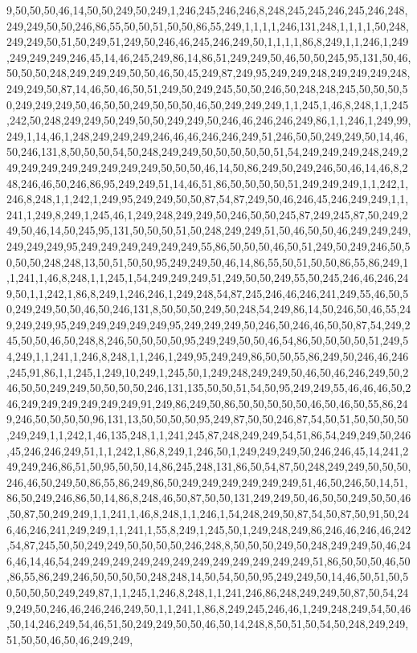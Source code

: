 9,50,50,50,46,14,50,50,249,50,249,1,246,245,246,246,8,248,245,245,246,245,246,248,249,249,50,50,246,86,55,50,50,51,50,50,86,55,249,1,1,1,1,246,131,248,1,1,1,1,50,248,249,249,50,51,50,249,51,249,50,246,46,245,246,249,50,1,1,1,1,86,8,249,1,1,246,1,249,249,249,249,246,45,14,46,245,249,86,14,86,51,249,249,50,46,50,50,245,95,131,50,46,50,50,50,248,249,249,249,50,50,46,50,45,249,87,249,95,249,249,248,249,249,249,248,249,249,50,87,14,46,50,46,50,51,249,50,249,245,50,50,246,50,248,248,245,50,50,50,50,249,249,249,50,46,50,50,249,50,50,50,46,50,249,249,249,1,1,245,1,46,8,248,1,1,245,242,50,248,249,249,50,249,50,50,249,249,50,246,46,246,246,249,86,1,1,246,1,249,99,249,1,14,46,1,248,249,249,249,246,46,46,246,246,249,51,246,50,50,249,249,50,14,46,50,246,131,8,50,50,50,54,50,248,249,249,50,50,50,50,50,51,54,249,249,249,248,249,249,249,249,249,249,249,249,249,50,50,50,46,14,50,86,249,50,249,246,50,46,14,46,8,248,246,46,50,246,86,95,249,249,51,14,46,51,86,50,50,50,50,51,249,249,249,1,1,242,1,246,8,248,1,1,242,1,249,95,249,249,50,50,87,54,87,249,50,46,246,45,246,249,249,1,1,241,1,249,8,249,1,245,46,1,249,248,249,249,50,246,50,50,245,87,249,245,87,50,249,249,50,46,14,50,245,95,131,50,50,50,51,50,248,249,249,51,50,46,50,50,46,249,249,249,249,249,249,95,249,249,249,249,249,249,55,86,50,50,50,46,50,51,249,50,249,246,50,50,50,50,248,248,13,50,51,50,50,95,249,249,50,46,14,86,55,50,51,50,50,86,55,86,249,1,1,241,1,46,8,248,1,1,245,1,54,249,249,249,51,249,50,50,249,55,50,245,246,46,246,249,50,1,1,242,1,86,8,249,1,246,246,1,249,248,54,87,245,246,46,246,241,249,55,46,50,50,249,249,50,50,46,50,246,131,8,50,50,50,249,50,248,54,249,86,14,50,246,50,46,55,249,249,249,95,249,249,249,249,249,95,249,249,249,50,246,50,246,46,50,50,87,54,249,245,50,50,46,50,248,8,246,50,50,50,50,95,249,249,50,50,46,54,86,50,50,50,50,51,249,54,249,1,1,241,1,246,8,248,1,1,246,1,249,95,249,249,86,50,50,55,86,249,50,246,46,246,245,91,86,1,1,245,1,249,10,249,1,245,50,1,249,248,249,249,50,46,50,46,246,249,50,246,50,50,249,249,50,50,50,50,246,131,135,50,50,51,54,50,95,249,249,55,46,46,46,50,246,249,249,249,249,249,249,91,249,86,249,50,86,50,50,50,50,50,46,50,46,50,55,86,249,246,50,50,50,50,96,131,13,50,50,50,50,95,249,87,50,50,246,87,54,50,51,50,50,50,50,249,249,1,1,242,1,46,135,248,1,1,241,245,87,248,249,249,54,51,86,54,249,249,50,246,45,246,246,249,51,1,1,242,1,86,8,249,1,246,50,1,249,249,249,50,246,246,45,14,241,249,249,246,86,51,50,95,50,50,14,86,245,248,131,86,50,54,87,50,248,249,249,50,50,50,246,46,50,249,50,86,55,86,249,86,50,249,249,249,249,249,249,51,46,50,246,50,14,51,86,50,249,246,86,50,14,86,8,248,46,50,87,50,50,131,249,249,50,46,50,50,249,50,50,46,50,87,50,249,249,1,1,241,1,46,8,248,1,1,246,1,54,248,249,50,87,54,50,87,50,91,50,246,46,246,241,249,249,1,1,241,1,55,8,249,1,245,50,1,249,248,249,86,246,46,246,46,242,54,87,245,50,50,249,249,50,50,50,50,246,248,8,50,50,50,249,50,248,249,249,50,46,246,46,14,46,54,249,249,249,249,249,249,249,249,249,249,249,249,51,86,50,50,50,46,50,86,55,86,249,246,50,50,50,50,248,248,14,50,54,50,50,95,249,249,50,14,46,50,51,50,50,50,50,50,249,249,87,1,1,245,1,246,8,248,1,1,241,246,86,248,249,249,50,87,50,54,249,249,50,246,46,246,246,249,50,1,1,241,1,86,8,249,245,246,46,1,249,248,249,54,50,46,50,14,246,249,54,46,51,50,249,249,50,50,46,50,14,248,8,50,51,50,54,50,248,249,249,51,50,50,46,50,46,249,249,